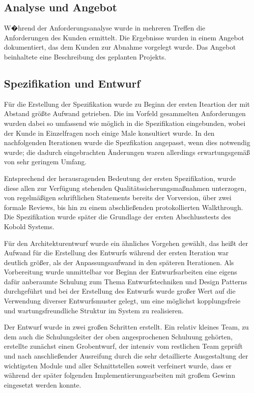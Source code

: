 \documentclass[a4paper,titlepage,12pt,ngerman]{scrbook}
\begin{document}
\subsection{Analyse und Angebot}
W�hrend der Anforderungsanalyse wurde in mehreren Treffen die
Anforderungen des Kunden ermittelt. Die Ergebnisse wurden in einem
Angebot dokumentiert, das dem Kunden zur Abnahme vorgelegt wurde. Das
Angebot beinhaltete eine Beschreibung des geplanten Projekts.

\subsection{Spezifikation und Entwurf}
Für die Erstellung der Spezifikation wurde zu Beginn der ersten Iteartion der mit Abstand
größte Aufwand getrieben. Die im Vorfeld gesammelten Anforderungen wurden dabei so umfassend
wie möglich in die Spezifikation eingebunden, wobei der Kunde in Einzelfragen noch einige
Male konsultiert wurde. In den nachfolgenden Iterationen wurde die Spezfikation angepasst,
wenn dies notwendig wurde; die dadurch eingebrachten Änderungen waren allerdings erwartungsgemäß 
von sehr geringem Umfang.\par
Entsprechend der herausragenden Bedeutung der ersten Spezifikation, wurde diese allen zur Verfügung
stehenden Qualitätssicherungsmaßnahmen unterzogen, von regelmäßigen schriftlichen Statements bereits
der Vorversion, über zwei formale Reviews, bis hin zu einem abschließenden protokollierten Walkthrough.
Die Spezifikation wurde später die Grundlage der ersten Abschlusstests des Kobold Systems.\par
Für den Architekturentwurf wurde ein ähnliches Vorgehen gewählt, das heißt der Aufwand für die Erstellung
des Entwurfs während der ersten Iteration war deutlich größer, als der Anpassungsaufwand in den späteren
Iterationen. Als Vorbereitung wurde unmittelbar vor Beginn der Entwurfsarbeiten eine eigens dafür anberaumte
Schulung zum Thema Entwurfstechniken und Design Patterns durchgeführt und bei der Erstellung des Entwurfs
wurde großer Wert auf die Verwendung diverser Entwurfsmuster gelegt, um eine möglichst kopplungsfreie und
wartungsfreundliche Struktur im System zu realisieren.\par
Der Entwurf wurde in zwei großen Schritten erstellt. Ein relativ kleines Team, zu dem auch die Schulungsleiter
der oben angesprochenen Schuluung gehörten, erstellte zunächst einen Grobentwurf, der intensiv vom restlichen 
Team geprüft und nach anschließender Ausreifung durch die sehr detaillierte Ausgestaltung der wichtigsten Module 
und aller Schnittstellen soweit verfeinert wurde, dass er während der später folgenden Implementierungsarbeiten 
mit großem Gewinn eingesetzt werden konnte.
\end{document}
